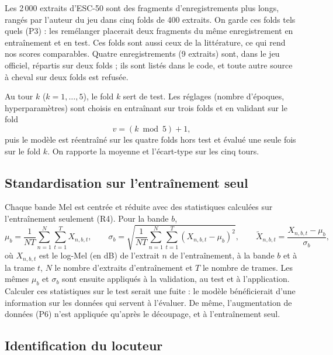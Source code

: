 Les 2\,000 extraits d'ESC-50 sont des fragments d'enregistrements plus longs, rangés par
l'auteur du jeu dans cinq folds de 400 extraits. On garde ces folds tels quels (P3) : les
remélanger placerait deux fragments du même enregistrement en entraînement et en test. Ces
folds sont aussi ceux de la littérature, ce qui rend nos scores comparables. Quatre
enregistrements (9 extraits) sont, dans le jeu officiel, répartis sur deux folds ; ils sont
listés dans le code, et toute autre source à cheval sur deux folds est refusée.

Au tour $k$ ($k = 1, \dots, 5$), le fold $k$ sert de test. Les réglages (nombre d'époques,
hyperparamètres) sont choisis en entraînant sur trois folds et en validant sur le fold
\begin{equation}
  v = (k \bmod 5) + 1 ,
\end{equation}
puis le modèle est réentraîné sur les quatre folds hors test et évalué une seule fois sur le
fold $k$. On rapporte la moyenne et l'écart-type sur les cinq tours.

\subsection{Standardisation sur l'entraînement seul}
\label{sec:r4}

Chaque bande Mel est centrée et réduite avec des statistiques calculées sur l'entraînement
seulement (R4). Pour la bande $b$,
\begin{equation}
  \mu_b = \frac{1}{N T} \sum_{n=1}^{N} \sum_{t=1}^{T} X_{n,b,t} , \qquad
  \sigma_b = \sqrt{\frac{1}{N T} \sum_{n=1}^{N} \sum_{t=1}^{T} \left(X_{n,b,t} - \mu_b\right)^2} , \qquad
  \tilde{X}_{n,b,t} = \frac{X_{n,b,t} - \mu_b}{\sigma_b} ,
\end{equation}
où $X_{n,b,t}$ est le log-Mel (en dB) de l'extrait $n$ de l'entraînement, à la bande $b$ et à
la trame $t$, $N$ le nombre d'extraits d'entraînement et $T$ le nombre de trames. Les mêmes
$\mu_b$ et $\sigma_b$ sont ensuite appliqués à la validation, au test et à l'application.
Calculer ces statistiques sur le test serait une fuite : le modèle bénéficierait d'une
information sur les données qui servent à l'évaluer. De même, l'augmentation de données (P6)
n'est appliquée qu'après le découpage, et à l'entraînement seul.

\subsection{Identification du locuteur}
\label{sec:p11}

